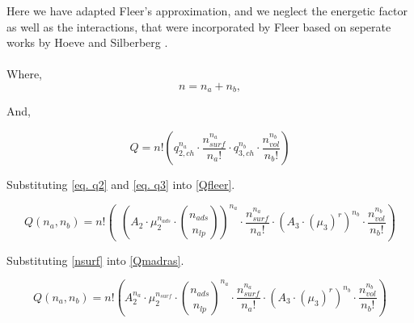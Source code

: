 \documentclass[10pt,letterpaper]{article}
\begin{document}
\noindent Here we have adapted Fleer's approximation, 
%
and we neglect the energetic factor as well as the interactions, that were incorporated by Fleer based on seperate works by Hoeve \cite{hoeve1970general}  and Silberberg \cite{silberberg1968adsorption}.\\\\

\noindent Where,
\begin{equation}
	n=n_a+n_b,
	\label{eq. n}
\end{equation}

\noindent And,



\begin{equation}
	Q=
	n!
	\left(
		q_{2,ch}^{n_{a}}
		\cdot
		\frac{
			n_{surf}^{n_{a}}
		}{
			n_a!
		}
		\cdot
		q_{3,ch}^{n_{b}}
		\cdot
		\frac{
			n_{vol}^{n_{b}}
		}{
			n_b!
		}
	\right)
	\label{Qfleer}
\end{equation}

\noindent Substituting \ref{eq. q2} and \ref{eq. q3} into \ref{Qfleer}.

\begin{equation}
	Q(n_a,n_b)=
	n!
	\left(~~
		\left(
		A_2
		\cdot 
		\mu_{2}^{n_{ads}}
		\cdot 
		\binom{
			n_{ads}
		}{
			n_{lp}
		}
		\right)^{n_{a}} 
		\cdot
		\frac{
			n_{surf}^{n_{a}}
		}{
			n_a!
		}
		\cdot
		\left(
			A_3
			\cdot
			\left(
				\mu_{3}
			\right)^{r}
		\right)^{n_{b}}
		\cdot
		\frac{
			n_{vol}^{n_{b}}
		}{
			n_b!
		}
	\right)
	\label{Qmadras}
\end{equation}

\noindent Substituting \ref{nsurf} into \ref{Qmadras}.

\begin{equation}
	Q(n_a,n_b)=
	n!
	\left(
		A_2^{n_{a}}
		\cdot 
		\mu_{2}^{n_{surf}} 
		\cdot 
		\binom{
			n_{ads}
		}{
			n_{lp}
		}^{n_{a}}
		\cdot
		\frac{
			n_{surf}^{n_{a}}
		}{
			n_a!
		}
		\cdot
		\left(
		A_3
		\cdot
		(\mu_{3})^{r}
	\right)^{n_{b}}
	\cdot
	\frac{
		n_{vol}^{n_{b}}
	}{
		n_b!
	}
	\right)
	\label{Qwithnsurf}
\end{equation}
\end{document}
